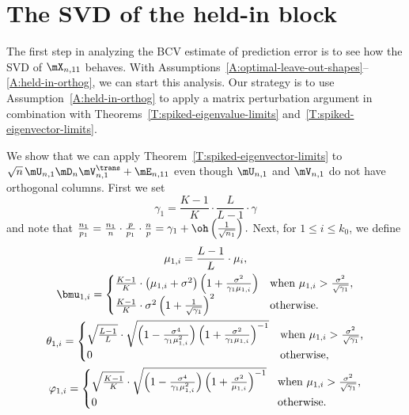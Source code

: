 \section{The SVD of the held-in block}

The first step in analyzing the BCV estimate of prediction error is to see how the SVD of $\mX_{n,11}$ behaves.  With Assumptions~\ref{A:optimal-leave-out-shapes}--\ref{A:held-in-orthog}, we can start this analysis.  Our strategy is to use Assumption~\ref{A:held-in-orthog} to apply a matrix perturbation argument in combination with Theorems~\ref{T:spiked-eigenvalue-limits} and~\ref{T:spiked-eigenvector-limits}.

We show that we can apply Theorem~\ref{T:spiked-eigenvector-limits} to 
$\sqrt{n} \, \mU_{n,1} \mD_n \mV_{n,1}^\trans + \mE_{n,11}$ even though $\mU_{n,1}$ and $\mV_{n,1}$ do not have orthogonal columns.  First we set
\[
	\gamma_1
		= 
		\frac{K-1}{K}
		\cdot
		\frac{L}{L-1}
		\cdot
		\gamma
\]
and note that 
\(
	\frac{n_1}{p_1} 
		= 
		\frac{n_1}{n} \cdot \frac{p}{p_1} \cdot \frac{n}{p}
		=
		\gamma_1 + \oh\left( \frac{1}{\sqrt{n_1}} \right).
\)
Next, for $1 \leq i \leq k_0$, we define
\begin{gather*}
	\mu_{1,i}
		= 
			\frac{L-1}{L} \cdot \mu_{i}, \\
	\bmu_{1,i}
		=
		\begin{cases}
			\frac{K-1}{K}
			\cdot
            \left( \mu_{1,i} + \sigma^2 \right)
            \left( 1 + \frac{\sigma^2}{\gamma_1 \mu_{1,i}} \right)
                &\text{when $\mu_{1,i} 
							 > 
							 \frac{\sigma^2}{\sqrt{\gamma_1}}$}, \\
			\frac{K-1}{K}
			\cdot
            \sigma^2 \left( 1 + \frac{1}{\sqrt{\gamma_1}} \right)^2
                &\text{otherwise.}
        \end{cases}		
			\\
	\theta_{1,i}
		=
	        \begin{cases}
				\sqrt{\frac{L-1}{L}}
				\cdot
				\sqrt{
		            \left( 
						1 
						- 
						\frac{\sigma^4}{ \gamma_1 \mu_{1,i}^2}
					\right)
		            \left(
						1 
						+ 
						\frac{\sigma^2}{ \gamma_1 \mu_{1,i} } 
					\right)^{-1}
				}
	            &\text{when $\mu_{1,i} 
							 > 
							 \frac{\sigma^2}{\sqrt{\gamma_1}}$,} \\
	            0
	            &\text{otherwise,}
	        \end{cases} \\
    \varphi_{1,i}
        =
            \begin{cases}
				\sqrt{\frac{K-1}{K}}
				\cdot
				\sqrt{
	                \left( 
						1 
						- 
						\frac{\sigma^4}{ \gamma_1 \mu_{1,i}^2} 
					\right)
	                \left(
						1 
						+ 
						\frac{\sigma^2}{ \mu_{1,i} } 
					\right)^{-1}
				}
                &\text{when $\mu_{1,i} 
							 > 
							\frac{\sigma^2}{\sqrt{\gamma_1}}$,} \\
                0
                &\text{otherwise.}
            \end{cases}
\end{gather*}
